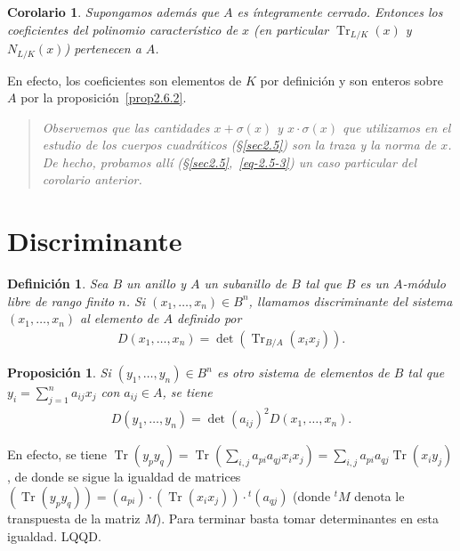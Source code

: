 \documentclass[bibtotoc,leqno,spanish]{amsbook}
\newcommand{\QED}{LQQD.}
\DeclareMathOperator{\Tr}{Tr}
\numberwithin{equation}{section}
\newenvironment{comm}%
	{\begin{quotation}\itshape}
	{\end{quotation}}
\theoremstyle{note}
\newtheorem{definition}{Definici\'on}
\theoremstyle{note}
\newtheorem{proposition}{Proposici\'on}
\newtheorem*{corollary*}{Corolario}
\theoremstyle{rem}
\numberwithin{theorem}{section}
\numberwithin{proposition}{section}
\numberwithin{definition}{section}
\numberwithin{lemma}{section}
\numberwithin{corollary}{section}
\numberwithin{example}{section}
\numberwithin{footnote}{section}%
\begin{document}
\begin{corollary*}
Supongamos adem\'as que $A$ es \'integramente cerrado. Entonces los coeficientes del polinomio caracter\'istico
de $x$ (en particular $\Tr_{L/K}(x)$ y $N_{L/K}(x)$) pertenecen a $A$.
\end{corollary*}

En efecto, los coeficientes son elementos de $K$ por definici\'on y son enteros sobre $A$ por la proposici\'on~\ref{prop2.6.2}.

\begin{comm}
Observemos que las cantidades $x+\sigma(x)$ y $x\cdot\sigma(x)$ que utilizamos en el estudio de los
cuerpos cuadr\'aticos (\S\ref{sec2.5}) son la traza y la norma de $x$. De hecho, probamos all\'i (\S\ref{sec2.5},~\eqref{eq-2.5-3})
un caso particular del corolario anterior.
\end{comm}

\section{Discriminante}\label{sec2.7}

\begin{definition}\label{def2.7.1}
Sea $B$ un anillo y $A$ un subanillo de $B$ tal que $B$ es un $A$-m\'odulo libre de rango finito $n$.
Si $(x_{1},\dots,x_{n})\in B^{n}$, llamamos discriminante del sistema $(x_{1},\dots,x_{n})$ al elemento
de $A$ definido por
\begin{gather}
D(x_{1},\dots,x_{n}) = \det(\Tr_{B/A}(x_{i}x_{j})).
\end{gather}
\end{definition}

\begin{proposition}\label{prop2.7.1}
Si $(y_{1},\dots,y_{n})\in B^{n}$ es otro sistema de elementos de $B$ tal que $y_{i} = \sum_{j=1}^{n}a_{ij}x_{j}$
con $a_{ij}\in A$, se tiene
\begin{gather}
D(y_{1},\dots,y_{n}) = \det(a_{ij})^{2}D(x_{1},\dots,x_{n}).
\end{gather}
\end{proposition}

En efecto, se tiene $\Tr(y_{p}y_{q}) = \Tr\left(\sum_{i,j}a_{pi}a_{qj}x_{i}x_{j}\right) = \sum_{i,j}a_{pi}a_{qj}
\Tr(x_{i}y_{j})$, de donde se sigue la igualdad de matrices
$(\Tr(y_{p}y_{q})) = (a_{pi})\cdot(\Tr(x_{i}x_{j}))\cdot{}^{t}(a_{qj})$ (donde ${}^{t}M$ denota le transpuesta de la
matriz $M$). Para terminar basta tomar determinantes en esta igualdad. \QED
\end{document}
